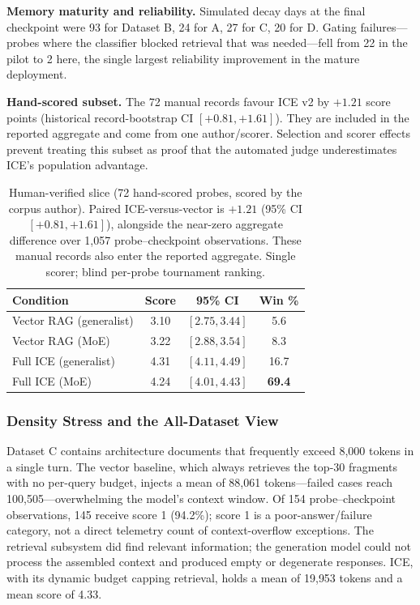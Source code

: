 \documentclass[11pt,a4paper]{article}
\begin{document}
\textbf{Memory maturity and reliability.} Simulated decay days at the final checkpoint were 93 for Dataset B, 24 for A, 27 for C, 20 for D. Gating failures---probes where the classifier blocked retrieval that was needed---fell from 22 in the pilot to 2 here, the single largest reliability improvement in the mature deployment.

\textbf{Hand-scored subset.} The 72 manual records favour ICE v2 by $+1.21$ score points (historical record-bootstrap CI $[+0.81,+1.61]$). They are included in the reported aggregate and come from one author/scorer. Selection and scorer effects prevent treating this subset as proof that the automated judge underestimates ICE's population advantage.

\begin{table}[htbp]
\centering
\small
\caption{Human-verified slice (72 hand-scored probes, scored by the corpus author). Paired ICE-versus-vector is $+1.21$ (95\% CI $[+0.81, +1.61]$), alongside the near-zero aggregate difference over 1{,}057 probe--checkpoint observations. These manual records also enter the reported aggregate. Single scorer; blind per-probe tournament ranking.}
\label{tab:manual}
\begin{tabular}{@{}lccc@{}}
\toprule
\textbf{Condition} & \textbf{Score} & \textbf{95\% CI} & \textbf{Win \%} \\
\midrule
Vector RAG (generalist) & 3.10 & $[2.75, 3.44]$ & 5.6 \\
Vector RAG (MoE)        & 3.22 & $[2.88, 3.54]$ & 8.3 \\
Full ICE (generalist)   & 4.31 & $[4.11, 4.49]$ & 16.7 \\
Full ICE (MoE)          & 4.24 & $[4.01, 4.43]$ & \textbf{69.4} \\
\bottomrule
\end{tabular}
\end{table}

\subsubsection{Density Stress and the All-Dataset View}
\label{sec:stress}

Dataset C contains architecture documents that frequently exceed 8{,}000 tokens in a single turn. The vector baseline, which always retrieves the top-30 fragments with no per-query budget, injects a mean of 88{,}061 tokens---failed cases reach 100{,}505---overwhelming the model's context window. Of 154 probe--checkpoint observations, 145 receive score 1 (94.2\%); score 1 is a poor-answer/failure category, not a direct telemetry count of context-overflow exceptions. The retrieval subsystem did find relevant information; the generation model could not process the assembled context and produced empty or degenerate responses. ICE, with its dynamic budget capping retrieval, holds a mean of 19{,}953 tokens and a mean score of 4.33.
\end{document}
